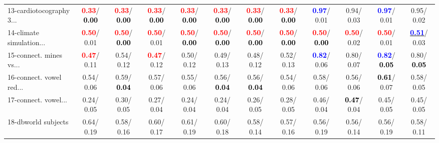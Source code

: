 \begin{table}[h]
\begin{center}
{\begin{tabular}{lc|c|c|c|c|c|c|c|c|c|c}
13-cardiotocography 3... & \textcolor{red}{\textbf{  0.33}}/\textcolor{black}{\textbf{  0.00}} & \textcolor{red}{\textbf{  0.33}}/\textcolor{black}{\textbf{  0.00}} & \textcolor{red}{\textbf{  0.33}}/\textcolor{black}{\textbf{  0.00}} & \textcolor{red}{\textbf{  0.33}}/\textcolor{black}{\textbf{  0.00}} & \textcolor{red}{\textbf{  0.33}}/\textcolor{black}{\textbf{  0.00}} & \textcolor{red}{\textbf{  0.33}}/\textcolor{black}{\textbf{  0.00}} & \textcolor{red}{\textbf{  0.33}}/\textcolor{black}{\textbf{  0.00}} & \textcolor{blue}{\textbf{  0.97}}/  0.01 &   0.94/  0.03 & \textcolor{blue}{\textbf{  0.97}}/  0.01 &   0.95/  0.02 \\
14-climate simulation... & \textcolor{red}{\textbf{  0.50}}/  0.01 & \textcolor{red}{\textbf{  0.50}}/\textcolor{black}{\textbf{  0.00}} & \textcolor{red}{\textbf{  0.50}}/  0.01 & \textcolor{red}{\textbf{  0.50}}/\textcolor{black}{\textbf{  0.00}} & \textcolor{red}{\textbf{  0.50}}/\textcolor{black}{\textbf{  0.00}} & \textcolor{red}{\textbf{  0.50}}/\textcolor{black}{\textbf{  0.00}} & \textcolor{red}{\textbf{  0.50}}/\textcolor{black}{\textbf{  0.00}} & \textcolor{red}{\textbf{  0.50}}/\textcolor{black}{\textbf{  0.00}} & \textcolor{red}{\textbf{  0.50}}/  0.02 & \textcolor{red}{\textbf{  0.50}}/  0.01 & \underline{\textcolor{blue}{\textbf{  0.51}}}/  0.03 \\ \hline
15-connect. mines vs... & \textcolor{red}{\textbf{  0.47}}/  0.11 &   0.54/  0.12 & \textcolor{red}{\textbf{  0.47}}/  0.12 &   0.50/  0.12 &   0.49/  0.13 &   0.48/  0.12 &   0.52/  0.13 & \textcolor{blue}{\textbf{  0.82}}/  0.06 &   0.80/  0.07 & \textcolor{blue}{\textbf{  0.82}}/\textcolor{black}{\textbf{  0.05}} &   0.80/\textcolor{black}{\textbf{  0.05}} \\
16-connect. vowel red... &   0.54/  0.06 &   0.59/\textcolor{black}{\textbf{  0.04}} &   0.57/  0.06 &   0.55/  0.06 &   0.56/\textcolor{black}{\textbf{  0.04}} &   0.56/\textcolor{black}{\textbf{  0.04}} &   0.54/  0.06 &   0.58/  0.06 &   0.56/  0.06 & \textcolor{black}{\textbf{  0.61}}/  0.07 &   0.58/  0.05 \\
17-connect. vowel... &   0.24/  0.05 &   0.30/  0.05 &   0.27/  0.04 &   0.24/  0.04 &   0.24/  0.04 &   0.26/  0.05 &   0.28/  0.05 &   0.46/  0.04 & \textcolor{black}{\textbf{  0.47}}/  0.04 &   0.45/  0.05 &   0.45/  0.05 \\
18-dbworld subjects &   0.64/  0.19 &   0.58/  0.16 &   0.60/  0.17 &   0.61/  0.19 &   0.60/  0.18 &   0.58/  0.14 &   0.57/  0.16 &   0.56/  0.19 &   0.56/  0.14 &   0.56/  0.19 &   0.58/  0.11 \\

\end{tabular}}
\end{center}
\end{table}
